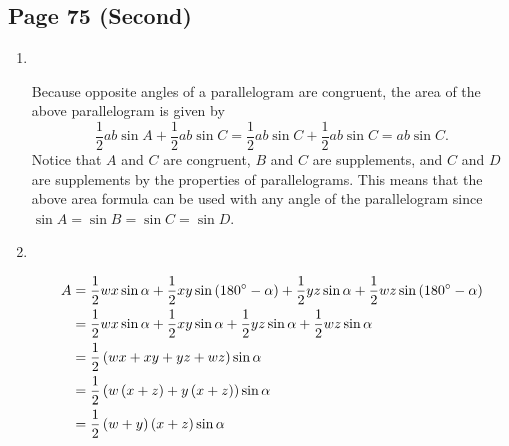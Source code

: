 \documentclass{article}
\newenvironment{solutions}[1]
{\subsection*{#1}
 \begin{enumerate}[leftmargin=1.5em]}
{\end{enumerate}}
\newcommand{\solution}{\item}
\begin{document}
\begin{solutions}{Page 75 (Second)}
\solution ~ %
\begin{center}
\end{center}
Because opposite angles of a parallelogram are congruent, the area of the above parallelogram is given by
\[
\dfrac{1}{2}ab\sin{A}+\dfrac{1}{2}ab\sin{C} = \dfrac{1}{2}ab\sin{C}+\dfrac{1}{2}ab\sin{C} = ab\sin{C}.
\]
Notice that $A$ and $C$ are congruent, $B$ and $C$ are supplements, and $C$ and $D$ are supplements by the properties of parallelograms. This means that the above area formula can be used with any angle of the parallelogram since $\sin{A}=\sin{B}=\sin{C}=\sin{D}$.

\solution ~ %
\begin{center}
\end{center}

\begin{align*}
A &= \dfrac{1}{2}wx\sin{\alpha} + \dfrac{1}{2}xy\sin\left(180\degree-\alpha\right) + \dfrac{1}{2}yz\sin{\alpha} + \dfrac{1}{2}wz\sin\left(180\degree-\alpha\right) \\
&= \dfrac{1}{2}wx\sin{\alpha} + \dfrac{1}{2}xy\sin{\alpha} + \dfrac{1}{2}yz\sin{\alpha} + \dfrac{1}{2}wz\sin{\alpha} \\
&= \dfrac{1}{2}\left(wx+xy+yz+wz\right)\sin{\alpha} \\
&= \dfrac{1}{2}\left(w\left(x+z\right)+y\left(x+z\right)\right)\sin{\alpha} \\
&= \dfrac{1}{2}\left(w+y\right)\left(x+z\right)\sin{\alpha}
\end{align*}


\end{solutions}
\end{document}
